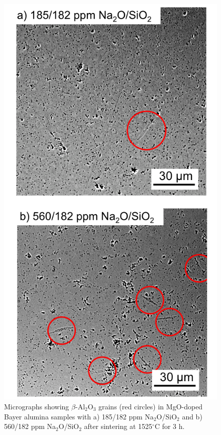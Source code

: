 \newpage
\begin{figure}[H]
	\centering
	\includegraphics[scale=0.82]{Chapter-5/Figures/Figure8.png}
	\caption{Micrographs showing $\beta$-Al$_{2}$O$_{3}$ grains (red circles) in MgO-doped Bayer alumina samples with a) 185/182 ppm Na$_{2}$O/SiO$_{2}$ and b) 560/182 ppm Na$_{2}$O/SiO$_{2}$ after sintering at 1525$^{\circ}$C for 3 h.}
	\label{Ch5-figure:Figure8}
\end{figure}

